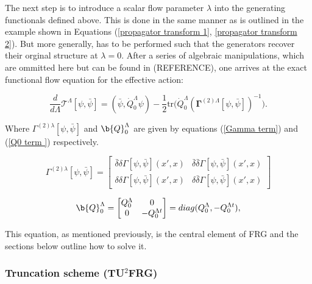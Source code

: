 \documentclass[12pt]{article}
\begin{document}
\noindent The next step is to introduce a scalar flow parameter $\lambda$ into the generating functionals defined above. This is done in the same manner as is outlined in the example shown in Equations (\ref{propagator transform 1}, \ref{propagator transform 2}). 
But more generally, has to be performed such that the generators recover their orginal structure at $\lambda = 0 $.
After a series of algebraic manipulations, which are ommitted here but can be found in (REFERENCE), one arrives at the exact functional flow equation for the effective action:


\begin{equation} \label{eq:ExactFunctionalFlowEquation}
    \frac{d}{d\Lambda} \mathcal{T}^{\Lambda}[\psi, \bar{\psi}] = (\bar{\psi}, \dot{Q}_0^{\Lambda} \psi) - \frac{1}{2} \text{tr} \big( \dot{Q}_0^{\Lambda} (\boldsymbol{\Gamma}^{(2)\Lambda}[\psi, \bar{\psi}])^{-1} \big).
\end{equation}

\noindent Where $\Gamma^{(2)\lambda}[\psi, \bar{\psi}]$ and  $\b{Q}_0^{\Lambda}$ are given by equations (\ref{Gamma term}) and (\ref{Q0 term }) respectively.



\begin{equation}\label{Gamma term}
\Gamma^{(2)\lambda}[\psi, \bar{\psi}] = 
\begin{bmatrix}
\bar{\delta} \delta \Gamma[\psi, \bar{\psi}](x',x) & \bar{\delta} \bar{\delta} \Gamma[\psi, \bar{\psi}](x',x) \\
\delta \delta \Gamma[\psi, \bar{\psi}](x',x)  & \delta \bar{\delta} \Gamma[\psi, \bar{\psi}](x',x)
\end{bmatrix}
\end{equation}



\begin{equation}\label{Q0 term }
\b{Q}_0^{\Lambda} =
\begin{bmatrix}
Q_0^{\Lambda} & 0 \\
0 & -Q_0^{\Lambda t}
\end{bmatrix}
= diag(Q_0^{\Lambda}, - Q_0^{\Lambda t}),
\end{equation}

\noindent This equation, as mentioned previously, is the central element of FRG and the sections below outline how to solve it.


\subsubsection{Truncation scheme (TU$^2$FRG)}
\label{subsubsec:Truncation scheme}
\end{document}
